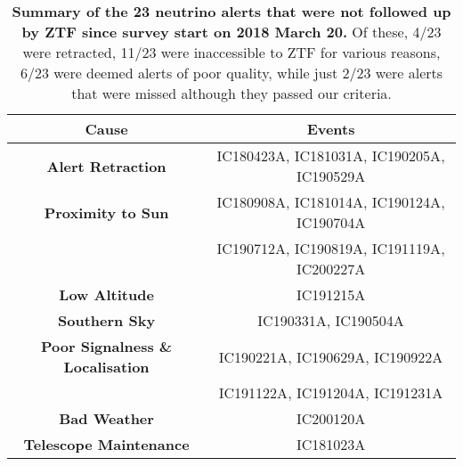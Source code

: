  \begin{table*}
 	\centering
 	\begin{tabular}{||c c ||} 
 		\hline
 		\textbf{Cause} & \textbf{Events} \\
 		\hline
 		\textbf{Alert Retraction} & IC180423A\cite{IC180423A}, IC181031A\cite{IC181031A}, IC190205A\cite{IC190205A}, IC190529A\cite{IC190529A}\\
 		\hline
 		\textbf{Proximity to Sun} &IC180908A\cite{IC180908A}, IC181014A\cite{IC181014A}, IC190124A\cite{IC190124A}, IC190704A\cite{IC190704A}\\
 		& IC190712A\cite{IC190712A}, IC190819A\cite{IC190819A}, IC191119A\cite{IC191119A}, IC200227A\cite{IC200227A}\\
 		\textbf{Low Altitude} & IC191215A\cite{IC191215A}\\
 		\textbf{Southern Sky} & IC190331A\cite{IC190331A}, IC190504A\cite{IC190504A}\\
 		\hline
 		\textbf{Poor Signalness \& Localisation} &
 		IC190221A\cite{IC190221A}, IC190629A\cite{IC190629A}, IC190922A\cite{IC190922A}\\
 		& IC191122A\cite{IC191122A}, IC191204A\cite{IC191204A}, IC191231A\cite{IC191231A}\\
 		\hline
 		\textbf{Bad Weather} & IC200120A\cite{IC200120A,IC200120A_2}\\
 		\textbf{Telescope Maintenance} & IC181023A\cite{IC181023A}\\
 		\hline
 	\end{tabular}
 	\caption{\textbf{Summary of the 23 neutrino alerts that were not followed up by ZTF since survey start on 2018 March 20.} Of these, 4/23 were retracted, 11/23 were inaccessible to ZTF for various reasons, 6/23 were deemed alerts of poor quality, while just 2/23 were alerts that were missed although they passed our criteria.}
 	\label{tab:nu_non_observed}
 \end{table*}

